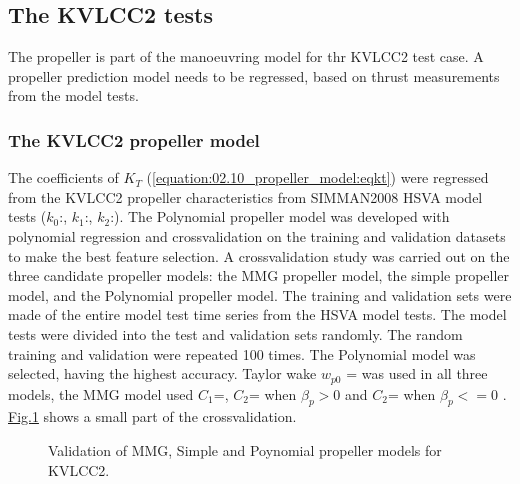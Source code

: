 \documentclass[review]{elsarticle}
\begin{document}
\subsection{The KVLCC2 tests}
\label{\detokenize{06.20_results_kvlcc2:the-kvlcc2-tests}}\label{\detokenize{06.20_results_kvlcc2::doc}}
\sphinxAtStartPar
The propeller is part of the manoeuvring model for thr KVLCC2 test case. A propeller prediction model needs to be regressed, based on thrust measurements from the model tests.


\subsubsection{The KVLCC2 propeller model}
\label{\detokenize{06.20_results_kvlcc2:the-kvlcc2-propeller-model}}\label{\detokenize{06.20_results_kvlcc2:results-propeller-model}}
\sphinxAtStartPar
The coefficients of \(K_T\) (\autoref{equation:02.10_propeller_model:eqkt}) were regressed from the KVLCC2 propeller characteristics from SIMMAN2008 HSVA model tests \cite{stern_experience_2011} (\(k_0\):, \(k_1\):, \(k_2\):).
The Polynomial propeller model was developed with polynomial regression and cross\sphinxhyphen{}validation on the training and validation datasets to make the best feature selection.
A cross\sphinxhyphen{}validation study was carried out on the three candidate propeller models: the MMG propeller model, the simple propeller model, and the Polynomial propeller model. The training and validation sets were made of the entire model test time series from the HSVA model tests.
The model tests were divided into the test and validation sets randomly. The random training and validation were repeated 100 times. The Polynomial model was selected, having the highest accuracy. Taylor wake \(w_{p0}\) =  was used in all three models, the MMG model used \(C_1\)=, \(C_2\)= when \(\beta_p>0\) and \(C_2\)= when \(\beta_p<=0\) \cite{yasukawa_introduction_2015-1}. \hyperref[\detokenize{06.20_results_kvlcc2:fig-propeller-validation}]{Fig.\@ \ref{\detokenize{06.20_results_kvlcc2:fig-propeller-validation}}} shows a small part of the cross\sphinxhyphen{}validation.

\begin{figure}[H]
\centering
\capstart

\noindent{}
\caption{Validation of MMG, Simple and Poynomial propeller models for KVLCC2.}\label{\detokenize{06.20_results_kvlcc2:fig-propeller-validation}}\end{figure}
\end{document}

